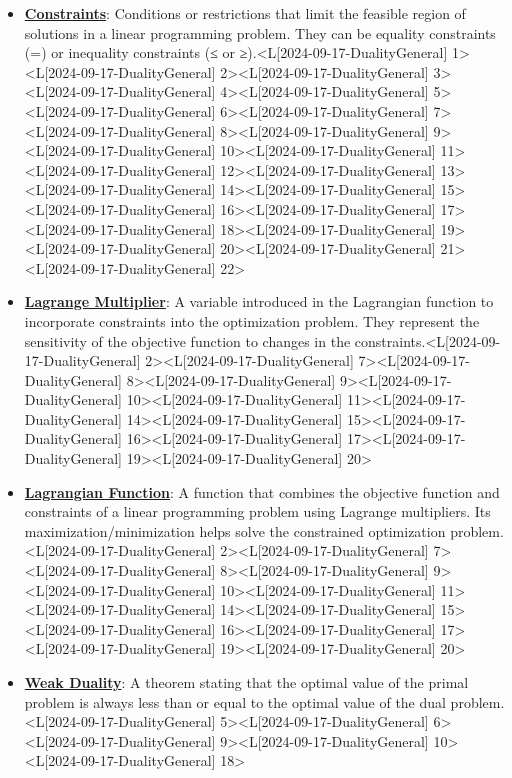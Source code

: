 \documentclass{article}%
\begin{document}
\begin{itemize}[[leftmargin=*]]
\item \href{https://www.math.purdue.edu/~yipn/421/2024-09-17-DualityGeneral.pdf#page=1}{\textbf{Constraints}}: Conditions or restrictions that limit the feasible region of solutions in a linear programming problem. They can be equality constraints (=) or inequality constraints (≤ or ≥).<L[2024-09-17-DualityGeneral] 1><L[2024-09-17-DualityGeneral] 2><L[2024-09-17-DualityGeneral] 3><L[2024-09-17-DualityGeneral] 4><L[2024-09-17-DualityGeneral] 5><L[2024-09-17-DualityGeneral] 6><L[2024-09-17-DualityGeneral] 7><L[2024-09-17-DualityGeneral] 8><L[2024-09-17-DualityGeneral] 9><L[2024-09-17-DualityGeneral] 10><L[2024-09-17-DualityGeneral] 11><L[2024-09-17-DualityGeneral] 12><L[2024-09-17-DualityGeneral] 13><L[2024-09-17-DualityGeneral] 14><L[2024-09-17-DualityGeneral] 15><L[2024-09-17-DualityGeneral] 16><L[2024-09-17-DualityGeneral] 17><L[2024-09-17-DualityGeneral] 18><L[2024-09-17-DualityGeneral] 19><L[2024-09-17-DualityGeneral] 20><L[2024-09-17-DualityGeneral] 21><L[2024-09-17-DualityGeneral] 22>%
\item \href{https://www.math.purdue.edu/~yipn/421/2024-09-17-DualityGeneral.pdf#page=2}{\textbf{Lagrange Multiplier}}: A variable introduced in the Lagrangian function to incorporate constraints into the optimization problem. They represent the sensitivity of the objective function to changes in the constraints.<L[2024-09-17-DualityGeneral] 2><L[2024-09-17-DualityGeneral] 7><L[2024-09-17-DualityGeneral] 8><L[2024-09-17-DualityGeneral] 9><L[2024-09-17-DualityGeneral] 10><L[2024-09-17-DualityGeneral] 11><L[2024-09-17-DualityGeneral] 14><L[2024-09-17-DualityGeneral] 15><L[2024-09-17-DualityGeneral] 16><L[2024-09-17-DualityGeneral] 17><L[2024-09-17-DualityGeneral] 19><L[2024-09-17-DualityGeneral] 20>%
\item \href{https://www.math.purdue.edu/~yipn/421/2024-09-17-DualityGeneral.pdf#page=2}{\textbf{Lagrangian Function}}: A function that combines the objective function and constraints of a linear programming problem using Lagrange multipliers. Its maximization/minimization helps solve the constrained optimization problem.<L[2024-09-17-DualityGeneral] 2><L[2024-09-17-DualityGeneral] 7><L[2024-09-17-DualityGeneral] 8><L[2024-09-17-DualityGeneral] 9><L[2024-09-17-DualityGeneral] 10><L[2024-09-17-DualityGeneral] 11><L[2024-09-17-DualityGeneral] 14><L[2024-09-17-DualityGeneral] 15><L[2024-09-17-DualityGeneral] 16><L[2024-09-17-DualityGeneral] 17><L[2024-09-17-DualityGeneral] 19><L[2024-09-17-DualityGeneral] 20>%
\item \href{https://www.math.purdue.edu/~yipn/421/2024-09-17-DualityGeneral.pdf#page=5}{\textbf{Weak Duality}}: A theorem stating that the optimal value of the primal problem is always less than or equal to the optimal value of the dual problem.<L[2024-09-17-DualityGeneral] 5><L[2024-09-17-DualityGeneral] 6><L[2024-09-17-DualityGeneral] 9><L[2024-09-17-DualityGeneral] 10><L[2024-09-17-DualityGeneral] 18>%

\end{itemize}
\end{document}
